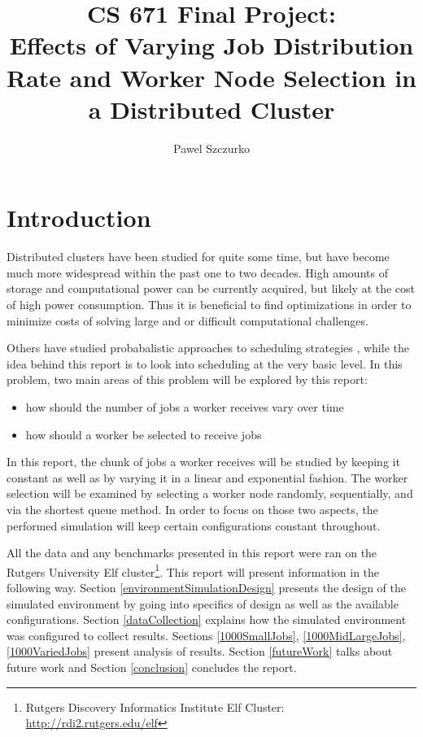 \documentclass{article}
\title{CS 671 Final Project:\\ Effects of Varying Job Distribution Rate and Worker Node Selection in a Distributed Cluster}
\author{Pawel Szczurko}
\affil{Rutgers University, New Brunswick}
\begin{document}
%
\maketitle


\section{Introduction}
Distributed clusters have been studied for quite some time, but have become much more widespread within the past one to two decades. High amounts of storage and computational power can be currently acquired, but likely at the cost of high power consumption. Thus it is beneficial to find optimizations in order to minimize costs of solving large and or difficult computational challenges.

Others have studied probabalistic approaches to scheduling strategies \cite{Karatza}, while the idea behind this report is to look into scheduling at the very basic level. In this problem, two main areas of this problem will be explored by this report:
\begin{itemize}
\item how should the number of jobs a worker receives vary over time
\item how should a worker be selected to receive jobs
\end{itemize}
In this report, the chunk of jobs a worker receives will be studied by keeping it constant as well as by varying it in a linear and exponential fashion. The worker selection will be examined by selecting a worker node randomly, sequentially, and via the shortest queue method. In order to focus on those two aspects, the performed simulation will keep certain configurations constant throughout.

All the data and any benchmarks presented in this report were ran on the Rutgers University Elf cluster\footnote{Rutgers Discovery Informatics Institute Elf Cluster: \url{http://rdi2.rutgers.edu/elf}}. This report will present information in the following way. Section \ref{environmentSimulationDesign} presents the design of the simulated environment by going into specifics of design as well as the available configurations. Section \ref{dataCollection} explains how the simulated environment was configured to collect results. Sections \ref{1000SmallJobs}, \ref{1000MidLargeJobs}, \ref{1000VariedJobs} present analysis of results. Section \ref{futureWork} talks about future work and Section \ref{conclusion} concludes the report.
\end{document}
